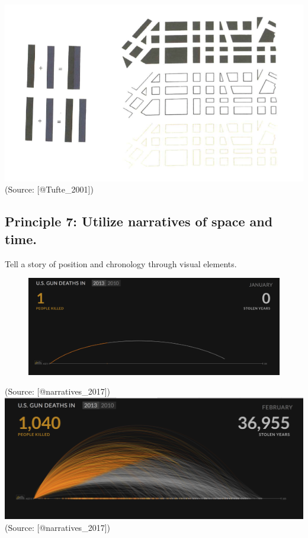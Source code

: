 \documentclass[]{book}
\theoremstyle{definition}
\theoremstyle{definition}
\theoremstyle{definition}
\theoremstyle{remark}
\begin{document}
\includegraphics{images/Tufte_figure10.png} (Source: {[}@Tufte\_2001{]})

\subsection{Principle 7: Utilize narratives of space and
time.}\label{principle-7-utilize-narratives-of-space-and-time.}

Tell a story of position and chronology through visual elements.

\begin{figure}
\centering
\includegraphics{images/Tufte_figure11.png}
\caption{}
\end{figure}

(Source: {[}@narratives\_2017{]})
\includegraphics{images/Tufte_figure12.png} (Source:
{[}@narratives\_2017{]})
\end{document}
